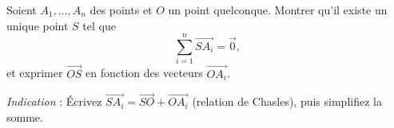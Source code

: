 Soient $A_1, \ldots, A_n$ des points et $O$ un point quelconque. Montrer
qu'il existe un unique point $S$ tel que
\[
\sum_{i=1}^{n} \overrightarrow{SA_i} = \overrightarrow{0},
\]
et exprimer $\overrightarrow{OS}$ en fonction des vecteurs
$\overrightarrow{OA_i}$.

\emph{Indication} : Écrivez $\overrightarrow{SA_i}=\overrightarrow{SO}+\overrightarrow{OA_i}$
(relation de Chasles), puis simplifiez la somme.
